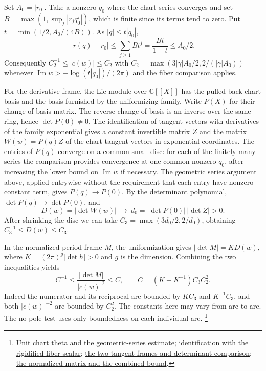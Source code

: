 Set \(A_0=|r_0|\). Take a nonzero \(q_0\) where the chart series
converges and set \(B=\max(1,\sup_j|r_jq_0^j|)\), which is
finite since its terms tend to zero. Put
\(t=\min(1/2,A_0/(4B))\). As \(|q|\le t|q_0|\),
\[
 |r(q)-r_0|\leq \sum_{j\geq1}Bt^j
          =\frac{Bt}{1-t}\leq A_0/2 .
\]
Consequently \(C_2^{-1}\leq |c(w)|\leq C_2\) with
\(C_2=\max(3|\gamma| A_0/2,2/(|\gamma| A_0))\) whenever
\(\operatorname{Im}w>-\log(t|q_0|)/(2\pi)\) and the fiber
comparison applies.

For the derivative frame, the Lie module over \(\mathbb C[[X]]\)
has the pulled-back chart basis and the basis furnished by the
uniformizing family. Write \(P(X)\) for their change-of-basis
matrix. The reverse change of basis is an inverse over the same
ring, hence \(\det P(0)\ne0\). The identification of tangent
vectors with derivatives of the family exponential gives a
constant invertible matrix \(Z\) and the matrix
\(W(w)=P(q)Z\) of the chart tangent vectors in exponential
coordinates. The entries of \(P(q)\) converge on a common small
disc: for each of the finitely many series the comparison provides
convergence at one common nonzero \(q_0\), after increasing the
lower bound on \(\operatorname{Im}w\) if necessary. The geometric
series argument above, applied entrywise without the requirement
that each entry have nonzero constant term, gives
\(P(q)\longrightarrow P(0)\). By the determinant polynomial,
\(\det P(q)\to\det P(0)\), and
\[
 D(w)=|\det W(w)|\ \longrightarrow\
       d_0=|\det P(0)|\,|\det Z|>0 .
\]
After shrinking the disc we can take
\(C_3=\max(3d_0/2,2/d_0)\), obtaining
\(C_3^{-1}\leq D(w)\leq C_3\).

In the normalized period frame \(M\), the uniformization gives
\(\lvert\det M\rvert=K D(w)\), where
\(K=(2\pi)^g|\det h|>0\) and \(g\) is the dimension.
Combining the two inequalities yields
\[
  C^{-1}\leq \frac{|\det M|}{|c(w)|^2}\leq C,\qquad
  C=(K+K^{-1})C_3C_2^2 .
\]
Indeed the numerator and its reciprocal are bounded by
\(K C_3\) and \(K^{-1}C_3\), and both \(|c(w)|^{\pm2}\) are
bounded by \(C_2^2\). The constants here may vary from arc to
arc. The no-pole test uses only boundedness on each individual
arc.
\footnote{\href{https://github.com/ChristianKudeba/alpoge-rh-verification/blob/alpoge-source-7cbf7a0c/src/Development/AbelianVarietyTheory/Proofs/IwasawaDecomposition/ThetaCoefficientBoundedAlongHolomorphicArc.lean}{Unit chart theta and the geometric-series estimate};
\href{https://github.com/ChristianKudeba/alpoge-rh-verification/blob/alpoge-source-7cbf7a0c/src/Development/AbelianVarietyTheory/Proofs/IwasawaDecomposition/ThetaConstantUniformisedChartFibreEqFamilyConsta.lean}{identification with the rigidified fiber scalar};
\href{https://github.com/ChristianKudeba/alpoge-rh-verification/blob/alpoge-source-7cbf7a0c/src/Development/AbelianVarietyTheory/Proofs/IwasawaDecomposition/LieBasisExpCoordsDetBoundedAlongArc.lean}{the two tangent frames and determinant comparison};
\href{https://github.com/ChristianKudeba/alpoge-rh-verification/blob/alpoge-source-7cbf7a0c/src/Development/AbelianVarietyTheory/Proofs/IwasawaDecomposition/ExistsNormalAtOfUnif.lean}{the normalized matrix and the combined bound}.}

